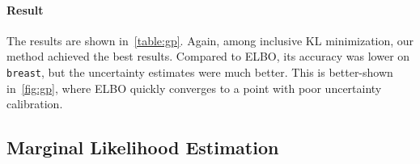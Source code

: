 \paragraph{Result}
The results are shown in~\cref{table:gp}.
Again, among inclusive KL minimization, our method achieved the best results.
Compared to ELBO, its accuracy was lower on \texttt{breast}, but the uncertainty estimates were much better.
This is better-shown in~\cref{fig:gp}, where ELBO quickly converges to a point with poor uncertainty calibration.

  \vspace{-0.05in}
\subsection{Marginal Likelihood Estimation}\label{section:mll}
  \vspace{-0.05in}
